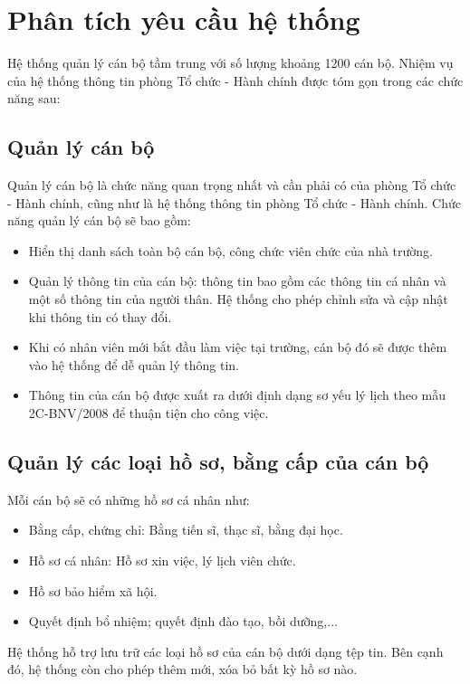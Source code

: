 \section{Phân tích yêu cầu hệ thống}
Hệ thống quản lý cán bộ tầm trung với số lượng khoảng 1200 cán bộ. Nhiệm vụ của hệ thống thông tin phòng Tổ chức - Hành chính được tóm gọn trong các chức năng sau: 
\subsection{Quản lý cán bộ}
Quản lý cán bộ là chức năng quan trọng nhất và cần phải có của phòng Tổ chức - Hành chính, cũng như là hệ thống thông tin phòng Tổ chức - Hành chính. Chức năng quản lý cán bộ sẽ bao gồm:
\begin{itemize}
    \item Hiển thị danh sách toàn bộ cán bộ, công chức viên chức của nhà trường.
    \item Quản lý thông tin của cán bộ: thông tin bao gồm các thông tin cá nhân và một số thông tin của người thân. Hệ thống cho phép chỉnh sửa và cập nhật khi thông tin có thay đổi.
    \item Khi có nhân viên mới bắt đầu làm việc tại trường, cán bộ đó sẽ được thêm vào hệ thống để dễ quản lý thông tin.
    \item Thông tin của cán bộ được xuất ra dưới định dạng sơ yếu lý lịch theo mẫu 2C-BNV/2008 để thuận tiện cho công việc.
\end{itemize}
\subsection{Quản lý các loại hồ sơ, bằng cấp của cán bộ}
Mỗi cán bộ sẽ có những hồ sơ cá nhân như:
\begin{itemize}
    \item Bằng cấp, chứng chỉ: Bằng tiến sĩ, thạc sĩ, bằng đại học.
    \item Hồ sơ cá nhân: Hồ sơ xin việc, lý lịch viên chức.
    \item Hồ sơ bảo hiểm xã hội.
    \item Quyết định bổ nhiệm; quyết định đào tạo, bồi dưỡng,...
\end{itemize}

Hệ thống hỗ trợ lưu trữ các loại hồ sơ của cán bộ dưới dạng tệp tin. Bên cạnh đó, hệ thống còn cho phép thêm mới, xóa bỏ bất kỳ hồ sơ nào.
